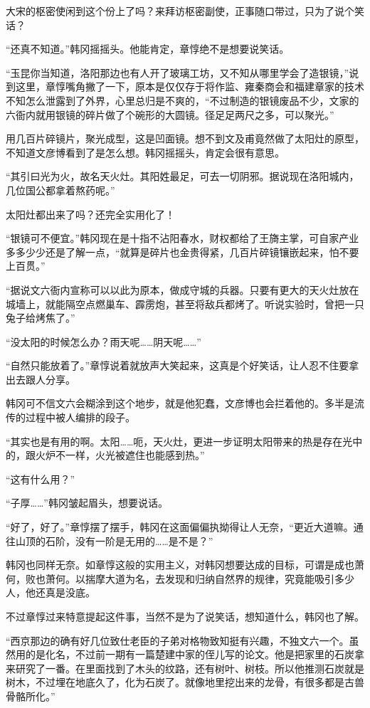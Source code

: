 大宋的枢密使闲到这个份上了吗？来拜访枢密副使，正事随口带过，只为了说个笑话？

“还真不知道。”韩冈摇摇头。他能肯定，章惇绝不是想要说笑话。

“玉昆你当知道，洛阳那边也有人开了玻璃工坊，又不知从哪里学会了造银镜，”说到这里，章惇嘴角撇了一下，原本是仅仅存于将作监、雍秦商会和福建章家的技术不知怎么泄露到了外界，心里总归是不爽的，“不过制造的银镜废品不少，文家的六衙内就用银镜的碎片做了个碗形的大圆镜。径足足两尺之多，可以聚光。”

用几百片碎镜片，聚光成型，这是凹面镜。想不到文及甫竟然做了太阳灶的原型，不知道文彦博看到了是怎么想。韩冈摇摇头，肯定会很有意思。

“其引曰光为火，故名天火灶。其阳姓最足，可去一切阴邪。据说现在洛阳城内，几位国公都拿着熬药呢。”

太阳灶都出来了吗？还完全实用化了！

“银镜可不便宜。”韩冈现在是十指不沾阳春水，财权都给了王旖主掌，可自家产业多多少少还是了解一点，“就算是碎片也金贵得紧，几百片碎镜镶嵌起来，怕不要上百贯。”

“据说文六衙内宣称可以以此为原本，做成守城的兵器。只要有更大的天火灶放在城墙上，就能隔空点燃巢车、霹雳炮，甚至将敌兵都烤了。听说实验时，曾把一只兔子给烤焦了。”

“没太阳的时候怎么办？雨天呢……阴天呢……”

“自然只能放着了。”章惇说着就放声大笑起来，这真是个好笑话，让人忍不住要拿出去跟人分享。

韩冈可不信文六会糊涂到这个地步，就是他犯蠢，文彦博也会拦着他的。多半是流传的过程中被人编排的段子。

“其实也是有用的啊。太阳……呃，天火灶，更进一步证明太阳带来的热是存在光中的，跟火炉不一样，火光被遮住也能感到热。”

“这有什么用？”

“子厚……”韩冈皱起眉头，想要说话。

“好了，好了。”章惇摆了摆手，韩冈在这面偏偏执拗得让人无奈，“更近大道嘛。通往山顶的石阶，没有一阶是无用的……是不是？”

韩冈也同样无奈。如章惇这般的实用主义，对韩冈想要达成的目标，可谓是成也萧何，败也萧何。以揣摩大道为名，去发现和归纳自然界的规律，究竟能吸引多少人，他还真是没底。

不过章惇过来特意提起这件事，当然不是为了说笑话，想知道什么，韩冈也了解。

“西京那边的确有好几位致仕老臣的子弟对格物致知挺有兴趣，不独文六一个。虽然用的是化名，不过前一期有一篇楚建中家的侄儿写的论文。他是把家里的石炭拿来研究了一番。在里面找到了木头的纹路，还有树叶、树枝。所以他推测石炭就是树木，不过埋在地底久了，化为石炭了。就像地里挖出来的龙骨，有很多都是古兽骨骼所化。”

